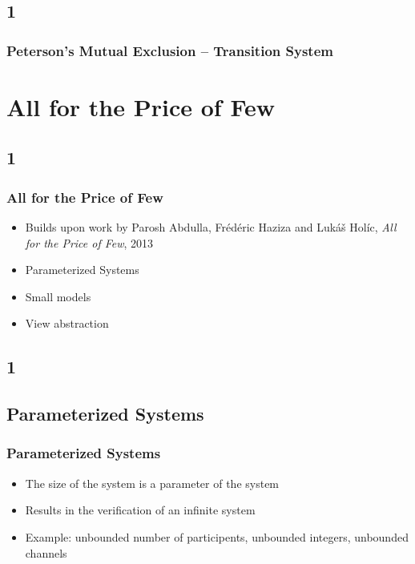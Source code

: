 \documentclass[handout]{beamer}
\begin{document}
\subsection*{1}
\begin{frame}
  \frametitle{Peterson's Mutual Exclusion -- Transition System}
  \begin{example}
    \petersonboth
  \end{example}
\end{frame}


\section{All for the Price of Few}
\subsection*{1}
\begin{frame}
  \frametitle{All for the Price of Few}
  \begin{itemize}
  \item Builds upon work by Parosh Abdulla, Fr\'ed\'eric Haziza and Luk\'a\v{s} Hol\'ic, \emph{All for the Price of Few}, 2013
  \item Parameterized Systems
  \item Small models
  \item View abstraction
  \end{itemize}
\end{frame}

\subsection*{1}
\subsection{Parameterized Systems}
\begin{frame}
  \frametitle{Parameterized Systems}
  \begin{itemize}
  \item
    The size of the system is a parameter of the system
  \item
    Results in the verification of an infinite system %
  \item
    Example: unbounded number of participents, unbounded integers, unbounded channels
  \end{itemize}
\end{frame}
\end{document}
